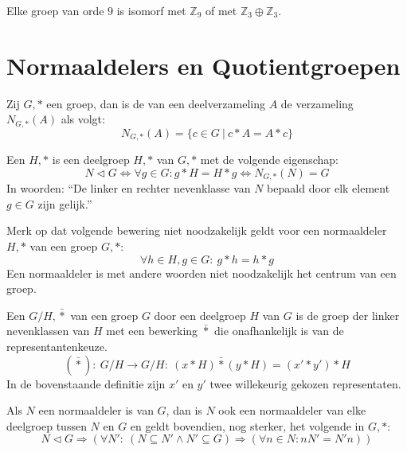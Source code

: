 \documentclass[main.tex]{subfiles}
\begin{document}
\begin{st}
  Elke groep van orde $9$ is isomorf met $\mathbb{Z}_{9}$ of met $\mathbb{Z}_{3} \oplus \mathbb{Z}_{3}$.
  
\end{st}

\section{Normaaldelers en Quotientgroepen}
\label{sec:normaaldelers-en-quotientgroepen}

\begin{de}
  Zij $G,*$ een groep, dan is de  van een deelverzameling $A$ de verzameling $N_{G,*}(A)$ als volgt:
  \[ N_{G,*}(A) = \{ c\in G \ |\ c*A = A*c \}\]
\end{de}

\begin{de}
  Een  $H,*$ is een deelgroep $H,*$ van $G,*$ met de volgende eigenschap:
  \[ N \triangleleft G \Leftrightarrow \forall g \in G: g*H = H*g \Leftrightarrow N_{G,*}(N) = G \]
  In woorden: ``De linker en rechter nevenklasse van $N$ bepaald door elk element $g\in G$ zijn gelijk.''
\end{de}

\begin{opm}
  Merk op dat volgende bewering niet noodzakelijk geldt voor een normaaldeler $H,*$ van een groep $G,*$:
  \[ \forall h \in H, g \in G:\ g*h = h*g \]
  Een normaaldeler is met andere woorden niet noodzakelijk het centrum van een groep.
\end{opm}

\begin{de}
  \examen
  Een  $G/H,\bar{*}$ van een groep $G$ door een deelgroep $H$ van $G$ is de groep der linker nevenklassen van $H$ met een bewerking $\bar{*}$ die onafhankelijk is van de representantenkeuze.
  \[ (\bar{*}):\ G/H \rightarrow G/H:\ (x*H)\bar{*}(y*H) = (x' * y') * H \]
  In de bovenstaande definitie zijn $x'$ en $y'$ twee willekeurig gekozen representaten.
\end{de}

\begin{ei}
  \label{ei:normaaldelers-tussen-groep-en-deler}
  Als $N$ een normaaldeler is van $G$, dan is $N$ ook een normaaldeler van elke deelgroep tussen $N$ en $G$ en geldt bovendien, nog sterker, het volgende in $G,*$:
  \[ N \triangleleft G \Rightarrow (\forall N':\ (N \subseteq N' \wedge N' \subseteq G) \Rightarrow (\forall n\in N: nN' = N'n)) \]
\end{ei}
\end{document}
